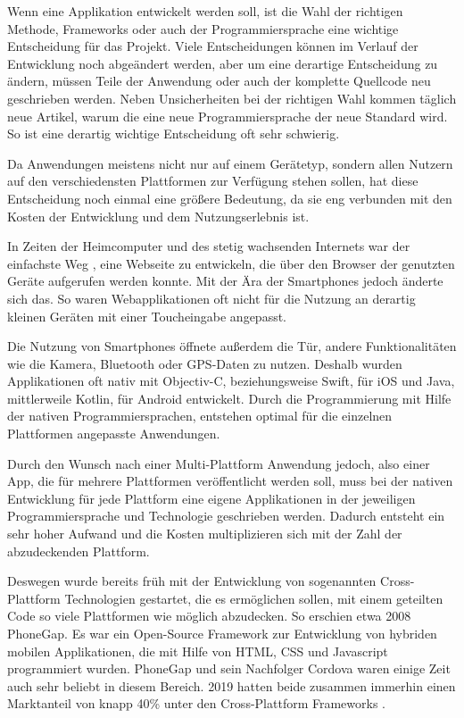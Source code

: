 Wenn eine Applikation entwickelt werden soll, ist die Wahl der richtigen Methode, Frameworks oder auch der Programmiersprache eine wichtige Entscheidung für das Projekt. Viele Entscheidungen können im Verlauf der Entwicklung noch abgeändert werden, aber um eine derartige Entscheidung zu ändern, müssen Teile der Anwendung oder auch der komplette Quellcode neu geschrieben werden. Neben Unsicherheiten bei der richtigen Wahl kommen täglich neue Artikel, warum die eine neue Programmiersprache der neue Standard wird. So ist eine derartig wichtige Entscheidung oft sehr schwierig.

Da Anwendungen meistens nicht nur auf einem Gerätetyp, sondern allen Nutzern auf den verschiedensten Plattformen zur Verfügung stehen sollen, hat diese Entscheidung noch einmal eine größere Bedeutung, da sie eng verbunden mit den Kosten der Entwicklung und dem Nutzungserlebnis ist.

In Zeiten der Heimcomputer und des stetig wachsenden Internets war der einfachste Weg , eine Webseite zu entwickeln, die über den Browser der genutzten Geräte aufgerufen werden konnte. Mit der Ära der Smartphones jedoch änderte sich das. So waren Webapplikationen oft nicht für die Nutzung an derartig kleinen Geräten mit einer Toucheingabe angepasst.

Die Nutzung von Smartphones öffnete außerdem die Tür, andere Funktionalitäten wie die Kamera, Bluetooth oder GPS-Daten zu nutzen. Deshalb wurden Applikationen oft nativ mit Objectiv-C, beziehungsweise Swift, für iOS und Java, mittlerweile Kotlin, für Android entwickelt. Durch die Programmierung mit Hilfe der nativen Programmiersprachen, entstehen optimal für die einzelnen Plattformen angepasste Anwendungen.

Durch den Wunsch nach einer Multi-Plattform Anwendung jedoch, also einer App, die für mehrere Plattformen veröffentlicht werden soll, muss bei der nativen Entwicklung für jede Plattform eine eigene Applikationen in der jeweiligen Programmiersprache und Technologie geschrieben werden. Dadurch entsteht ein sehr hoher Aufwand und die Kosten multiplizieren sich mit der Zahl der abzudeckenden Plattform.

Deswegen wurde bereits früh mit der Entwicklung von sogenannten Cross-Plattform Technologien gestartet, die es ermöglichen sollen, mit einem geteilten Code so viele Plattformen wie möglich abzudecken. So erschien etwa 2008 PhoneGap. Es war ein Open-Source Framework zur Entwicklung von hybriden mobilen Applikationen, die mit Hilfe von HTML, CSS und Javascript programmiert wurden. PhoneGap und sein Nachfolger Cordova waren einige Zeit auch sehr beliebt in diesem Bereich. 2019 hatten beide zusammen immerhin einen Marktanteil von knapp 40\% unter den Cross-Plattform Frameworks \cite{statist_CP_Framework}.

